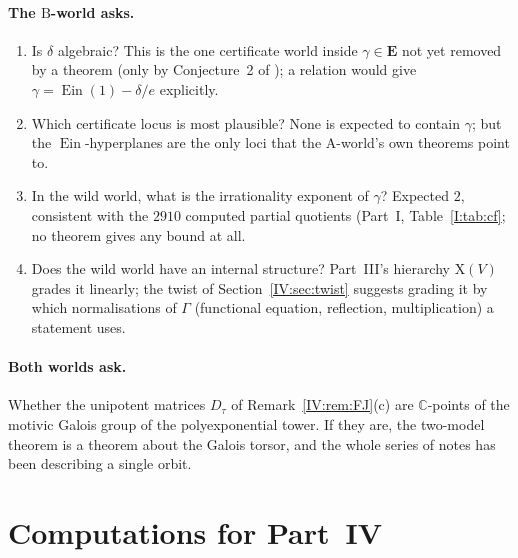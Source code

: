 \documentclass[11pt,a4paper]{article}
\newcommand{\C}{\mathbb C}
\newcommand{\Ein}{\operatorname{Ein}}
\newcommand{\EE}{\mathbf E}
\theoremstyle{definition}
\theoremstyle{remark}
\numberwithin{equation}{section}
\begin{document}
\paragraph{The $\mathrm B$-world asks.}
\begin{enumerate}[label=(B\arabic*)]
\item Is $\delta$ algebraic? This is the one certificate world inside $\gamma\in\EE$ not yet
removed by a theorem (only by Conjecture~2 of \cite{FRmixed}); a relation would give
$\gamma=\Ein(1)-\delta/e$ explicitly.
\item Which certificate locus is most plausible? None is expected to contain $\gamma$; but
the $\Ein$-hyperplanes are the only loci that the $\mathrm A$-world's own theorems point
to.
\item In the wild world, what is the irrationality exponent of $\gamma$? Expected $2$,
consistent with the $2910$ computed partial quotients (Part~I, Table~\ref{I:tab:cf}; no theorem gives
any bound at all.
\item Does the wild world have an internal structure? Part~III's hierarchy
$\mathrm X(V)$ grades it linearly; the twist of Section~\ref{IV:sec:twist} suggests grading it
by which normalisations of $\Gamma$ (functional equation, reflection, multiplication) a
statement uses.
\end{enumerate}

\paragraph{Both worlds ask.} Whether the unipotent matrices $D_\tau$ of
Remark~\ref{IV:rem:FJ}(c) are $\C$-points of the motivic Galois group of the polyexponential
tower. If they are, the two-model theorem is a theorem about the Galois torsor, and the
whole series of notes has been describing a single orbit.

\section{Computations for Part~IV}\label{IV:sec:computations}
\end{document}
